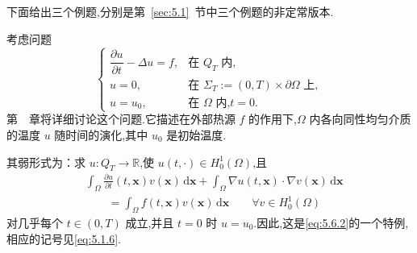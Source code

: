 下面给出三个例题,分别是第~\ref{sec:5.1}~节中三个例题的非定常版本.

\begin{example}[(热方程)]\label{ex:5.6.1}
考虑问题
\begin{equation}\label{eq:5.6.3}
  \begin{cases}
    \dfrac{\partial u}{\partial t}-\Delta u=f,&\text{在 }Q_T\text{ 内},\\[2pt]
    u=0,&\text{在 }\Sigma_T:=(0,T)\times\partial\Omega\text{ 上},\\
    u=u_0,&\text{在 }\Omega\text{ 内,}t=0.
  \end{cases}
\end{equation}
第~~章将详细讨论这个问题.它描述在外部热源 \(f\) 的作用下,\(\Omega\) 内各向同性均匀介质的温度 \(u\) 随时间的演化,其中 \(u_0\) 是初始温度.

其弱形式为：求 \(u\colon Q_T\to\mathbb R\),使 \(u(t,\cdot)\in H_0^1(\Omega)\),且
\begin{equation}\label{eq:5.6.4}
  \begin{aligned}
    &\int_\Omega\frac{\partial u}{\partial t}(t,\boldsymbol{x})v(\boldsymbol{x})\,\mathrm d\boldsymbol{x}
      +\int_\Omega\nabla u(t,\boldsymbol{x})\cdot\nabla v(\boldsymbol{x})\,\mathrm d\boldsymbol{x}\\
    &\qquad=\int_\Omega f(t,\boldsymbol{x})v(\boldsymbol{x})\,\mathrm d\boldsymbol{x}
      \qquad\forall v\in H_0^1(\Omega)
  \end{aligned}
\end{equation}
对几乎每个 \(t\in(0,T)\) 成立,并且 \(t=0\) 时 \(u=u_0\).因此,这是\eqref{eq:5.6.2}的一个特例,相应的记号见\eqref{eq:5.1.6}.
\end{example}


